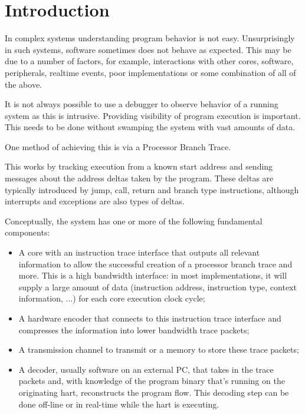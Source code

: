 \chapter{Introduction}
\label{sec:intro}

In complex systems understanding program behavior is not easy.
Unsurprisingly in such systems, software sometimes does not behave as
expected. This may be due to a number of factors, for example,
interactions with other cores, software, peripherals, realtime
events, poor implementations or some combination of all of the above.

It is not always possible to use a debugger to observe behavior of a
running system as this is intrusive.  Providing visibility of program
execution is important.  This needs to be done without swamping the
system with vast amounts of data.

One method of achieving this is via a Processor Branch Trace.

This works by tracking execution from a known start address and sending
messages about the address deltas taken by the program. These deltas are
typically introduced by jump, call, return and branch type instructions,
although interrupts and exceptions are also types of deltas.

Conceptually, the system has one or more of the following fundamental components:

\begin{itemize}
  \item
    A core with an instruction trace interface that outputs all relevant
    information to allow the successful creation of a processor branch trace and more.
    This is a high bandwidth interface: in most implementations, it will supply
    a large amount of data (instruction address, instruction type, context information, ...)
    for each core execution clock cycle;
  \item
    A hardware encoder that connects to this instruction trace interface and compresses
    the information into lower bandwidth trace packets;
  \item
    A transmission channel to transmit or a memory to store these trace packets;
  \item
    A decoder, usually software on an external PC, that takes in the trace
    packets and, with knowledge of the program binary that's running on the
    originating hart, reconstructs the program flow. This decoding step can
    be done off-line or in real-time while the hart is executing.
\end{itemize}

